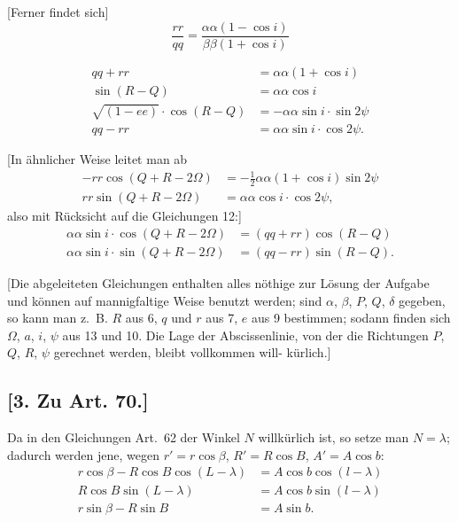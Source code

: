 \documentclass[12pt,a4paper]{article}
\begin{document}
[Ferner findet sich]
\begin{equation}\label{eq:12}
\tag{12}
\frac{rr}{qq} = \frac{\alpha\alpha(1 - \cos i)}{\beta\beta(1 + \cos i)}
\end{equation}

\begin{align*}
qq + rr &= \alpha\alpha(1 + \cos i) \\
\sin(R - Q) &= \alpha\alpha\cos i \\
\sqrt{(1 - ee)} \cdot \cos(R - Q) &= -\alpha\alpha\sin i \cdot \sin 2\psi \\
qq - rr &= \alpha\alpha\sin i \cdot \cos 2\psi.
\end{align*}

[In \"ahnlicher Weise leitet man ab
\begin{align*}
-rr\cos(Q + R - 2\Omega) &= -\tfrac{1}{2}\alpha\alpha(1 + \cos i)\sin 2\psi \\
rr\sin(Q + R - 2\Omega) &= \alpha\alpha\cos i \cdot \cos 2\psi,
\end{align*}
also mit R\"ucksicht auf die Gleichungen 12:]
\begin{equation}\label{eq:13}
\tag{13}
\begin{aligned}
\alpha\alpha\sin i \cdot \cos(Q + R - 2\Omega) &= (qq + rr)\cos(R - Q) \\
\alpha\alpha\sin i \cdot \sin(Q + R - 2\Omega) &= (qq - rr)\sin(R - Q).
\end{aligned}
\end{equation}

[Die abgeleiteten Gleichungen enthalten alles n\"othige zur L\"osung der
Aufgabe und k\"onnen auf mannigfaltige Weise benutzt werden; sind $\alpha$, $\beta$, $P$,
$Q$, $\delta$ gegeben, so kann man z.~B. $R$ aus 6, $q$ und $r$ aus 7, $e$ aus 9 bestimmen;
sodann finden sich $\Omega$, $a$, $i$, $\psi$ aus 13 und 10. Die Lage der Abscissenlinie,
von der die Richtungen $P$, $Q$, $R$, $\psi$ gerechnet werden, bleibt vollkommen will-
k\"urlich.]

\subsection*{[3. Zu Art. 70.]}

Da in den Gleichungen Art.~62 der Winkel $N$ willk\"urlich ist, so setze
man $N = \lambda$; dadurch werden jene, wegen $r' = r\cos\beta$, $R' = R\cos B$, $A' = A\cos b$:
\begin{align}
\tag{1} r\cos\beta - R\cos B \cos(L - \lambda) &= A\cos b \cos(l - \lambda) \\
\tag{2} R\cos B \sin(L - \lambda) &= A\cos b \sin(l - \lambda) \\
\tag{3} r\sin\beta - R\sin B &= A\sin b.
\end{align}
\end{document}
